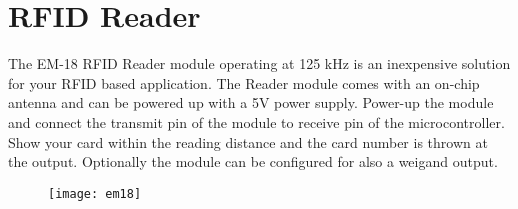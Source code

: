 \documentclass[a4paper,11pt]{article}
\begin{document}
\newpage

\section{RFID Reader}
\begin{scriptsize}
The EM-18 RFID Reader module operating at 125 kHz is an inexpensive solution for your RFID based application. The Reader module comes with an on-chip antenna and can be powered up with a 5V power supply. 
Power-up the module and connect the transmit pin of the module to receive pin of the microcontroller. Show your card within the reading distance and the card number is thrown at the output. Optionally the module can be configured for also a weigand output.\\
\begin{figure}
\texttt{[image: em18]}
\end{figure}

\end{scriptsize}

\newpage
\end{document}
